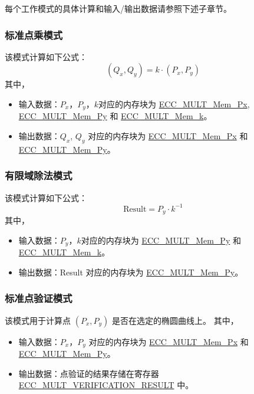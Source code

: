\documentclass[main\_\_CN.tex]{subfiles}
\begin{document}
每个工作模式的具体计算和输入/输出数据请参照下述子章节。
\subsubsection{标准点乘模式}

该模式计算如下公式：
\[
(Q_x,Q_y) = k \cdot (P_x,P_y)
\]
其中，
\begin{itemize}
    \item 输入数据：$P_x$，$P_y$，$k$对应的内存块为 \hyperref[tab:ecc-memory]{ECC\_MULT\_Mem\_Px}, \hyperref[tab:ecc-memory]{ECC\_MULT\_Mem\_Py} 和 \hyperref[tab:ecc-memory]{ECC\_MULT\_Mem\_k}。
    \item 输出数据：$Q_x$, $Q_y$ 对应的内存块为 \hyperref[tab:ecc-memory]{ECC\_MULT\_Mem\_Px} 和 \hyperref[tab:ecc-memory]{ECC\_MULT\_Mem\_Py}。
\end{itemize}

\subsubsection{有限域除法模式}

该模式计算如下公式：
\[
\textrm{Result} = P_y \cdot k^{-1}
\]
其中，
\begin{itemize}
    \item 输入数据：$P_y$，$k$对应的内存块为 \hyperref[tab:ecc-memory]{ECC\_MULT\_Mem\_Py} 和 \hyperref[tab:ecc-memory]{ECC\_MULT\_Mem\_k}。
    \item 输出数据：Result 对应的内存块为 \hyperref[tab:ecc-memory]{ECC\_MULT\_Mem\_Py}。
\end{itemize}

\subsubsection{标准点验证模式}

该模式用于计算点 $(P_x, P_y)$ 是否在选定的椭圆曲线上。
其中，
\begin{itemize}
    \item 输入数据：$P_x$，$P_y$ 对应的内存块为 \hyperref[tab:ecc-memory]{ECC\_MULT\_Mem\_Px} 和 \hyperref[tab:ecc-memory]{ECC\_MULT\_Mem\_Py}。
    \item 输出数据：点验证的结果存储在寄存器 \hyperref[fielddesc:ECCMULTVERIFICATIONRESULT]{ECC\_MULT\_VERIFICATION\_RESULT} 中。
\end{itemize}
\end{document}
